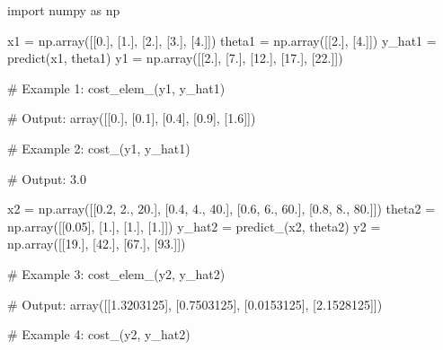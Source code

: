 \documentclass[]{article}
\newenvironment{Shaded}{\begin{snugshade}}{\end{snugshade}}
\newcommand{\CommentTok}[1]{\textcolor[rgb]{0.48,0.49,0.49}{#1}}
\newcommand{\FloatTok}[1]{\textcolor[rgb]{0.96,0.45,0.00}{#1}}
\newcommand{\ImportTok}[1]{\textcolor[rgb]{0.15,0.68,0.38}{#1}}
\newcommand{\NormalTok}[1]{\textcolor[rgb]{0.81,0.81,0.76}{#1}}
\newcommand{\OperatorTok}[1]{\textcolor[rgb]{0.81,0.81,0.76}{#1}}
\begin{document}
\begin{Shaded}
\begin{Highlighting}[]
\ImportTok{import}\NormalTok{ numpy }\ImportTok{as}\NormalTok{ np}

\NormalTok{x1 }\OperatorTok{=}\NormalTok{ np.array([[}\FloatTok{0.}\NormalTok{], [}\FloatTok{1.}\NormalTok{], [}\FloatTok{2.}\NormalTok{], [}\FloatTok{3.}\NormalTok{], [}\FloatTok{4.}\NormalTok{]])}
\NormalTok{theta1 }\OperatorTok{=}\NormalTok{ np.array([[}\FloatTok{2.}\NormalTok{], [}\FloatTok{4.}\NormalTok{]])}
\NormalTok{y_hat1 }\OperatorTok{=}\NormalTok{ predict(x1, theta1)}
\NormalTok{y1 }\OperatorTok{=}\NormalTok{ np.array([[}\FloatTok{2.}\NormalTok{], [}\FloatTok{7.}\NormalTok{], [}\FloatTok{12.}\NormalTok{], [}\FloatTok{17.}\NormalTok{], [}\FloatTok{22.}\NormalTok{]])}

\CommentTok{# Example 1:}
\NormalTok{cost_elem_(y1, y_hat1)}

\CommentTok{# Output:}
\NormalTok{array([[}\FloatTok{0.}\NormalTok{], [}\FloatTok{0.1}\NormalTok{], [}\FloatTok{0.4}\NormalTok{], [}\FloatTok{0.9}\NormalTok{], [}\FloatTok{1.6}\NormalTok{]])}

\CommentTok{# Example 2:}
\NormalTok{cost_(y1, y_hat1)}

\CommentTok{# Output:}
\FloatTok{3.0}

\NormalTok{x2 }\OperatorTok{=}\NormalTok{ np.array([[}\FloatTok{0.2}\NormalTok{, }\FloatTok{2.}\NormalTok{, }\FloatTok{20.}\NormalTok{], [}\FloatTok{0.4}\NormalTok{, }\FloatTok{4.}\NormalTok{, }\FloatTok{40.}\NormalTok{], [}\FloatTok{0.6}\NormalTok{, }\FloatTok{6.}\NormalTok{, }\FloatTok{60.}\NormalTok{], [}\FloatTok{0.8}\NormalTok{, }\FloatTok{8.}\NormalTok{, }\FloatTok{80.}\NormalTok{]])}
\NormalTok{theta2 }\OperatorTok{=}\NormalTok{ np.array([[}\FloatTok{0.05}\NormalTok{], [}\FloatTok{1.}\NormalTok{], [}\FloatTok{1.}\NormalTok{], [}\FloatTok{1.}\NormalTok{]])}
\NormalTok{y_hat2 }\OperatorTok{=}\NormalTok{ predict_(x2, theta2)}
\NormalTok{y2 }\OperatorTok{=}\NormalTok{ np.array([[}\FloatTok{19.}\NormalTok{], [}\FloatTok{42.}\NormalTok{], [}\FloatTok{67.}\NormalTok{], [}\FloatTok{93.}\NormalTok{]])}

\CommentTok{# Example 3:}
\NormalTok{cost_elem_(y2, y_hat2)}

\CommentTok{# Output:}
\NormalTok{array([[}\FloatTok{1.3203125}\NormalTok{], [}\FloatTok{0.7503125}\NormalTok{], [}\FloatTok{0.0153125}\NormalTok{], [}\FloatTok{2.1528125}\NormalTok{]])}

\CommentTok{# Example 4:}
\NormalTok{cost_(y2, y_hat2)}


\end{Highlighting}
\end{Shaded}
\end{document}
